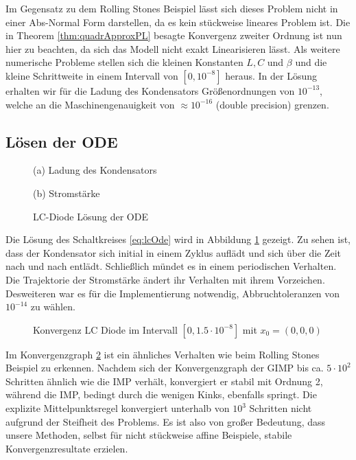 Im Gegensatz zu dem Rolling Stones Beispiel lässt sich dieses Problem nicht in einer Abs-Normal Form darstellen, da es kein stückweise lineares Problem ist. Die in Theorem \ref{thm:quadrApproxPL} besagte Konvergenz zweiter Ordnung ist nun hier zu beachten, da sich das Modell nicht exakt Linearisieren lässt. Als weitere numerische Probleme stellen sich die kleinen Konstanten $L,C$ und $\beta$ und die kleine Schrittweite in einem Intervall von $[0, 10^{-8}]$ heraus. In der Lösung erhalten wir für die Ladung des Kondensators Größenordnungen von $10^{-13}$, welche an die Maschinengenauigkeit von $\approx 10^{-16}$ (double precision) grenzen.

\subsection{Lösen der ODE}
\begin{figure}[H]
\footnotesize 
\centering
\begin{minipage}[b]{0.49\linewidth}

\caption*{(a) Ladung des Kondensators}
\end{minipage}
\begin{minipage}[b]{0.49\linewidth}

\caption*{(b) Stromstärke}
\end{minipage}
\caption{LC-Diode Lösung der ODE}
\label{fig:lc_solution}
\end{figure}
Die Lösung des Schaltkreises \eqref{eq:lcOde} wird in Abbildung \ref{fig:lc_solution} gezeigt. Zu sehen ist, dass der Kondensator sich initial in einem Zyklus auflädt und sich über die Zeit nach und nach entlädt. Schließlich mündet es in einem periodischen Verhalten. Die Trajektorie der Stromstärke ändert ihr Verhalten mit ihrem Vorzeichen. Desweiteren war es für die Implementierung notwendig, Abbruchtoleranzen von $10^{-14}$ zu wählen. 

\begin{figure}
\centering

\caption{Konvergenz LC Diode im Intervall $[0,1.5\cdot 10^{-8}]$ mit $x_0=(0,0,0)$}
\label{fig:lcConvergence}
\end{figure}
Im Konvergenzgraph \ref{fig:lcConvergence} ist ein ähnliches Verhalten wie beim Rolling Stones Beispiel zu erkennen. Nachdem sich der Konvergenzgraph der GIMP bis ca. $5\cdot 10^2$ Schritten ähnlich wie die IMP verhält, konvergiert er stabil mit Ordnung 2, während die IMP, bedingt durch die wenigen Kinks, ebenfalls springt. Die explizite Mittelpunktsregel konvergiert unterhalb von $10^3$ Schritten nicht aufgrund der Steifheit des Problems.
Es ist also von großer Bedeutung, dass unsere Methoden, selbst für nicht stückweise affine Beispiele, stabile Konvergenzresultate erzielen.

